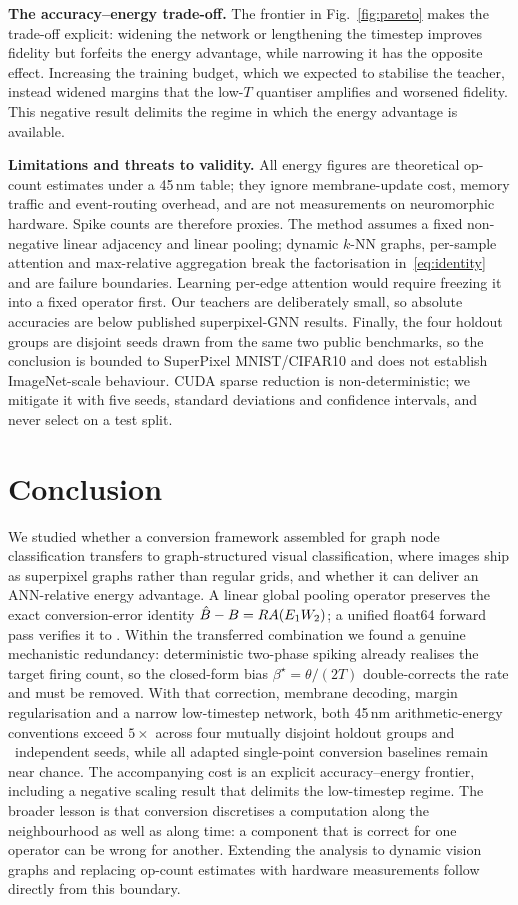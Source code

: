 \textbf{The accuracy--energy trade-off.} The frontier in Fig.~\ref{fig:pareto} makes the trade-off explicit: widening the network or lengthening the timestep improves fidelity but forfeits the energy advantage, while narrowing it has the opposite effect. Increasing the training budget, which we expected to stabilise the teacher, instead widened margins that the low-$T$ quantiser amplifies and worsened fidelity. This negative result delimits the regime in which the energy advantage is available.

\textbf{Limitations and threats to validity.} All energy figures are theoretical op-count estimates under a 45\,nm table; they ignore membrane-update cost, memory traffic and event-routing overhead, and are not measurements on neuromorphic hardware. Spike counts are therefore proxies. The method assumes a fixed non-negative linear adjacency and linear pooling; dynamic $k$-NN graphs, per-sample attention and max-relative aggregation break the factorisation in~\eqref{eq:identity} and are failure boundaries. Learning per-edge attention would require freezing it into a fixed operator first. Our teachers are deliberately small, so absolute accuracies are below published superpixel-GNN results. Finally, the four holdout groups are disjoint seeds drawn from the same two public benchmarks, so the conclusion is bounded to SuperPixel MNIST/CIFAR10 and does not establish ImageNet-scale behaviour. CUDA sparse reduction is non-deterministic; we mitigate it with five seeds, standard deviations and confidence intervals, and never select on a test split.

\section{Conclusion}
\label{sec:conclusion}

We studied whether a conversion framework assembled for graph node classification transfers to graph-structured visual classification, where images ship as superpixel graphs rather than regular grids, and whether it can deliver an ANN-relative energy advantage. A linear global pooling operator preserves the exact conversion-error identity $\hat{B}-B=R A(E_1W_2)$; a unified float64 forward pass verifies it to \IdentityMax. Within the transferred combination we found a genuine mechanistic redundancy: deterministic two-phase spiking already realises the target firing count, so the closed-form bias $\beta^\star=\theta/(2T)$ double-corrects the rate and must be removed. With that correction, membrane decoding, margin regularisation and a narrow low-timestep network, both 45\,nm arithmetic-energy conventions exceed $5\times$ across four mutually disjoint holdout groups and \TotalSeeds\ independent seeds, while all adapted single-point conversion baselines remain near chance. The accompanying cost is an explicit accuracy--energy frontier, including a negative scaling result that delimits the low-timestep regime. The broader lesson is that conversion discretises a computation along the neighbourhood as well as along time: a component that is correct for one operator can be wrong for another. Extending the analysis to dynamic vision graphs and replacing op-count estimates with hardware measurements follow directly from this boundary.

